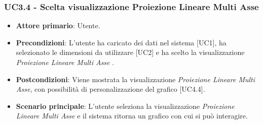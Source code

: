 \subsubsection{UC3.4 - Scelta visualizzazione Proiezione Lineare Multi Asse}

\begin{itemize}
	\item \textbf{Attore primario}: Utente.
	\item \textbf{Precondizioni}: L'utente ha caricato dei dati nel sistema [UC1], ha selezionato le dimensioni da utilizzare [UC2] e ha scelto la visualizzazione \textit{Proiezione Lineare Multi Asse} .
	\item \textbf{Postcondizioni}: Viene mostrata la visualizzazione \textit{Proiezione Lineare Multi Asse}, con possibilità di personalizzazione del grafico [UC4.4].
	\item \textbf{Scenario principale}: L'utente seleziona la visualizzazione \textit{Proiezione Lineare Multi Asse} e il sistema ritorna un grafico con cui si può interagire.
\end{itemize}